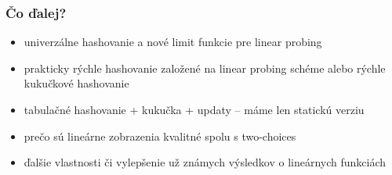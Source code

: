 \begin{frame}
	\frametitle{Čo ďalej?}

	\begin{itemize}
		\item univerzálne hashovanie a nové limit funkcie pre linear probing
		\item prakticky rýchle hashovanie založené na linear probing schéme alebo rýchle kukučkové hashovanie
		\item tabulačné hashovanie + kukučka + updaty -- máme len statickú verziu
		\item prečo sú lineárne zobrazenia kvalitné spolu s two-choices
		\item ďalšie vlastnosti či vylepšenie už známych výsledkov o lineárnych funkciách
	\end{itemize}
\end{frame}
